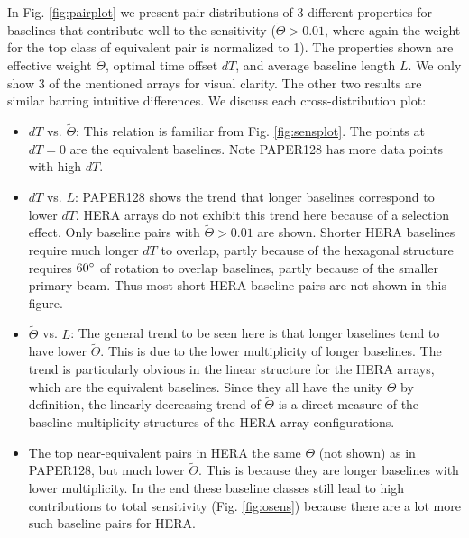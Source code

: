 \documentclass[twocolumn,apj,numberedappendix]{emulateapj}
\renewcommand\[{\begin{equation}}
\renewcommand\]{\end{equation}}
\begin{document}
In Fig. \ref{fig:pairplot} we present pair-distributions of 3 different properties for baselines that contribute well to the sensitivity ($\widetilde{\Theta}>0.01$, where again the weight for the top class of equivalent pair is normalized to 1). The properties shown are effective weight $\widetilde{\Theta}$, optimal time offset $dT$, and average baseline length $L$. We only show 3 of the mentioned arrays for visual clarity. The other two results are similar barring intuitive differences. We discuss each cross-distribution plot:
\begin{itemize}

\item $dT$ vs. $\widetilde{\Theta}$:
This relation  is familiar from Fig. \ref{fig:sensplot}. The points at $dT=0$ are the equivalent baselines. Note PAPER128 has more data points with high $dT$. 

\item $dT$ vs. $L$:
PAPER128 shows the trend that longer baselines correspond to lower $dT$. HERA arrays do not exhibit this trend here because of a selection effect. Only baseline pairs with $\widetilde{\Theta}>0.01$ are shown. Shorter HERA baselines require much longer $dT$ to overlap, partly because of the hexagonal structure requires $60\degree$ of rotation to overlap baselines, partly because of the smaller primary beam. Thus most short HERA baseline pairs are not shown in this figure.


\item $\widetilde{\Theta}$ vs. $L$:
The general trend to be seen here is that longer baselines tend to have lower $\widetilde{\Theta}$. This is due to the lower multiplicity of longer baselines. The trend is particularly obvious in the linear structure for the HERA arrays, which are the equivalent baselines. Since they all have the unity $\Theta$ by definition, the linearly decreasing trend of $\widetilde{\Theta}$ is a direct measure of the baseline multiplicity structures of the HERA array configurations.

\item The top near-equivalent pairs in HERA the same $\Theta$ (not shown) as in PAPER128, but much lower $\widetilde{\Theta}$. This is because they are longer baselines with lower multiplicity. In the end these baseline classes still lead to high contributions to total sensitivity (Fig. \ref{fig:osens}) because there are a lot more such baseline pairs for HERA.  

\end{itemize}
\end{document}
